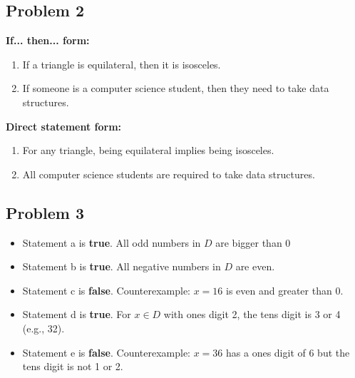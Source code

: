 \documentclass[a4paper, 10pt]{article}
\begin{document}
    \subsection{Problem 2}
        \textbf{If... then... form:}
            \begin{enumerate}
                \item If a triangle is equilateral, then it is isosceles.
                \item If someone is a computer science student, then they need to take data structures.
            \end{enumerate}

        \noindent \textbf{Direct statement form:}
            \begin{enumerate}
                \item For any triangle, being equilateral implies being isosceles.
                \item All computer science students are required to take data structures.
            \end{enumerate}

    \subsection{Problem 3}
        \begin{itemize}
            \item Statement a is \textbf{true}. All odd numbers in \( D \) are bigger than 0
            \item Statement b is \textbf{true}. All negative numbers in \( D \) are even.
            \item Statement c is \textbf{false}. Counterexample: \( x = 16 \) is even and greater than 0.
            \item Statement d is \textbf{true}. For \( x \in D \) with ones digit 2, the tens digit is 3 or 4 (e.g., 32).
            \item Statement e is \textbf{false}. Counterexample: \( x = 36 \) has a ones digit of 6 but the tens digit is not 1 or 2.
        \end{itemize}
\end{document}
